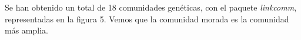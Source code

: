  \begin{minipage}{\linewidth}
	\label{fig: Figura 4}
\end{minipage}

\begin{spacing}{1}
Se han obtenido un total de 18 comunidades genéticas, con el paquete \textit{linkcomm}, representadas en la figura 5. Vemos que la comunidad morada es la comunidad más amplia. 
\end{spacing}

